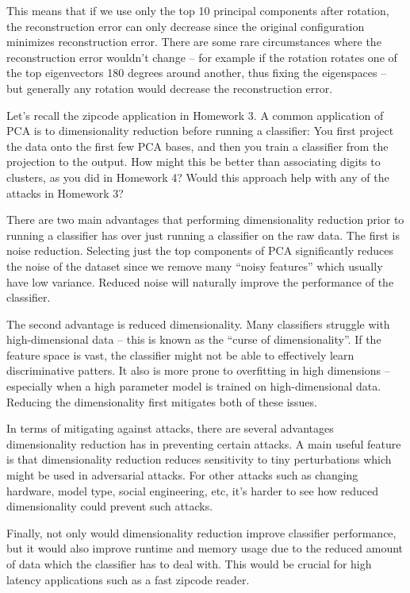\documentclass[expanded]{lkx_pset}
\begin{document}
\begin{parts}
	This means that if we use only the top 10 principal components after rotation, the reconstruction error can only decrease since the original configuration minimizes reconstruction error. There are some rare circumstances where the reconstruction error wouldn't change -- for example if the rotation rotates one of the top eigenvectors 180 degrees around another, thus fixing the eigenspaces -- but generally any rotation would decrease the reconstruction error.

	\begin{part}{5}
		Let's recall the zipcode application in Homework 3.  A common
		application of PCA is to dimensionality reduction before running a
		classifier: You first project the data onto the first few PCA bases,
		and then you train a classifier from the projection to the output.
		How might this be better than associating digits to clusters, as you
		did in Homework 4?  Would this approach help with any of the attacks
		in Homework 3?
	\end{part}

	There are two main advantages that performing dimensionality reduction prior to running a classifier has over just running a classifier on the raw data. The first is noise reduction. Selecting just the top components of PCA significantly reduces the noise of the dataset since we remove many ``noisy features'' which usually have low variance. Reduced noise will naturally improve the performance of the classifier.

	The second advantage is reduced dimensionality. Many classifiers struggle with high-dimensional data -- this is known as the ``curse of dimensionality''. If the feature space is vast, the classifier might not be able to effectively learn discriminative patters. It also is more prone to overfitting in high dimensions -- especially when a high parameter model is trained on high-dimensional data. Reducing the dimensionality first mitigates both of these issues.

	In terms of mitigating against attacks, there are several advantages dimensionality reduction has in preventing certain attacks. A main useful feature is that dimensionality reduction reduces sensitivity to tiny perturbations which might be used in adversarial attacks. For other attacks such as changing hardware, model type, social engineering, etc, it's harder to see how reduced dimensionality could prevent such attacks.

	Finally, not only would dimensionality reduction improve classifier performance, but it would also improve runtime and memory usage due to the reduced amount of data which the classifier has to deal with. This would be crucial for high latency applications such as a fast zipcode reader.


\end{parts}
\end{document}
